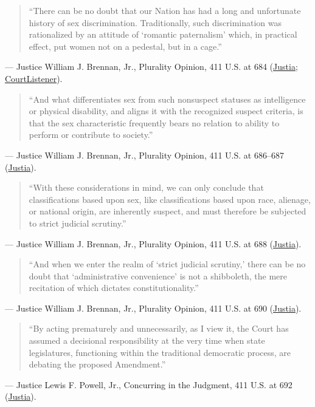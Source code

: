 \documentclass[12pt]{article}
\begin{document}
\begin{quote}
``There can be no doubt that our Nation has had a long and unfortunate history of sex discrimination. Traditionally, such discrimination was rationalized by an attitude of `romantic paternalism' which, in practical effect, put women not on a pedestal, but in a cage.''
\end{quote}
\noindent --- Justice William J. Brennan, Jr., Plurality Opinion, 411 U.S. at 684 (\href{https://supreme.justia.com/cases/federal/us/411/677/}{Justia}; \href{https://www.courtlistener.com/opinion/108781/frontiero-v-richardson/}{CourtListener}).

\begin{quote}
``And what differentiates sex from such nonsuspect statuses as intelligence or physical disability, and aligns it with the recognized suspect criteria, is that the sex characteristic frequently bears no relation to ability to perform or contribute to society.''
\end{quote}
\noindent --- Justice William J. Brennan, Jr., Plurality Opinion, 411 U.S. at 686--687 (\href{https://supreme.justia.com/cases/federal/us/411/677/}{Justia}).

\begin{quote}
``With these considerations in mind, we can only conclude that classifications based upon sex, like classifications based upon race, alienage, or national origin, are inherently suspect, and must therefore be subjected to strict judicial scrutiny.''
\end{quote}
\noindent --- Justice William J. Brennan, Jr., Plurality Opinion, 411 U.S. at 688 (\href{https://supreme.justia.com/cases/federal/us/411/677/}{Justia}).

\begin{quote}
``And when we enter the realm of `strict judicial scrutiny,' there can be no doubt that `administrative convenience' is not a shibboleth, the mere recitation of which dictates constitutionality.''
\end{quote}
\noindent --- Justice William J. Brennan, Jr., Plurality Opinion, 411 U.S. at 690 (\href{https://supreme.justia.com/cases/federal/us/411/677/}{Justia}).

\begin{quote}
``By acting prematurely and unnecessarily, as I view it, the Court has assumed a decisional responsibility at the very time when state legislatures, functioning within the traditional democratic process, are debating the proposed Amendment.''
\end{quote}
\noindent --- Justice Lewis F. Powell, Jr., Concurring in the Judgment, 411 U.S. at 692 (\href{https://supreme.justia.com/cases/federal/us/411/677/}{Justia}).
\end{document}
